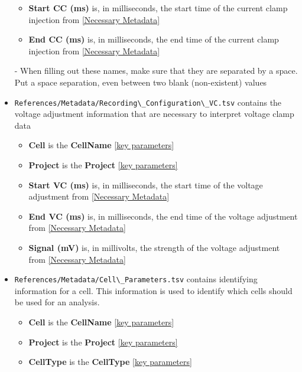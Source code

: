 \documentclass{article}
\begin{document}
\begin{itemize}
\begin{itemize}
        \item \textbf{Start CC (ms)} is, in milliseconds, the start time of the current clamp injection from \ref{Necessary Metadata}
        
        \item \textbf{End CC (ms)} is, in milliseconds, the end time of the current clamp injection from \ref{Necessary Metadata}
    \end{itemize}
    
    - When filling out these names, make sure that they are separated by a space. Put a space separation, even between two blank (non-existent) values
    
    \item \verb|References/Metadata/Recording\_Configuration\_VC.tsv| contains the voltage adjustment information that are necessary to interpret voltage clamp data
    \begin{itemize}
        \item \textbf{Cell} is the \textbf{CellName} \ref{key parameters}
        
        \item \textbf{Project} is the \textbf{Project} \ref{key parameters}
        
        \item \textbf{Start VC (ms)} is, in milliseconds, the start time of the voltage adjustment from \ref{Necessary Metadata}
        
        \item \textbf{End VC (ms)} is, in milliseconds, the end time of the voltage adjustment from \ref{Necessary Metadata}
        
        \item \textbf{Signal (mV)} is, in millivolts, the strength of the voltage adjustment from \ref{Necessary Metadata}
    \end{itemize}
    
    \item \verb|References/Metadata/Cell\_Parameters.tsv| contains identifying information for a cell. This information is used to identify which cells should be used for an analysis.
    \begin{itemize}
        \item \textbf{Cell} is the \textbf{CellName} \ref{key parameters}
        
        \item \textbf{Project} is the \textbf{Project} \ref{key parameters}
        
        \item \textbf{CellType} is the \textbf{CellType} \ref{key parameters}
        

\end{itemize}
\end{itemize}
\end{document}
